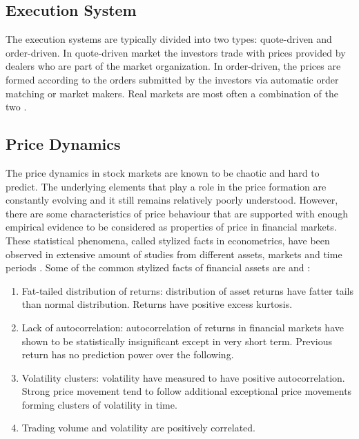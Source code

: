 
\subsection{Execution System}
The execution systems are typically divided into two types:
quote-driven and order-driven. In quote-driven market the investors
trade with prices provided by dealers who are part of the market 
organization. In order-driven, the prices are formed according to
the orders submitted by the investors via automatic order matching 
or market makers. \citep{Baru17} Real markets are most often a combination
of the two \citep{boer05}.

\subsection{Price Dynamics}
The price dynamics in stock markets are known to be chaotic and hard to 
predict. The underlying elements that play a role in the price formation
are constantly evolving and it still remains relatively poorly understood.
However, there are some characteristics of price behaviour that are supported
with enough empirical evidence to be considered as properties of price in
financial markets. These statistical phenomena, called stylized facts in
econometrics, have been observed in extensive amount of studies from 
different assets, markets and time periods \citep{Shakeel18}. 
Some of the common stylized facts of financial assets are \citep{StylizedFacts01} and \citep{lob13}:

\begin{enumerate}
    \item Fat-tailed distribution of returns: distribution of asset returns have fatter tails than normal distribution. Returns have positive excess kurtosis.
    \item Lack of autocorrelation: autocorrelation of returns in financial markets have shown to be statistically insignificant except in very short term. Previous return has no prediction power over the following. 
    \item Volatility clusters: volatility have measured to have positive autocorrelation. Strong price movement tend to follow additional exceptional price movements forming clusters of volatility in time.
    \item Trading volume and volatility are positively correlated.
\end{enumerate} 
